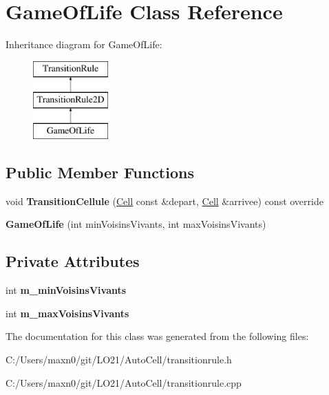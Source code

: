 \hypertarget{class_game_of_life}{}\section{Game\+Of\+Life Class Reference}
\label{class_game_of_life}
Inheritance diagram for Game\+Of\+Life\+:\begin{figure}[H]
\begin{center}
\leavevmode
\includegraphics[height=3.000000cm]{class_game_of_life}
\end{center}
\end{figure}
\subsection*{Public Member Functions}
\begin{DoxyCompactItemize}
\item 
\mbox{\label{class_game_of_life_a12e6db1719e64adc023e1a7d2976d38d}} 
void {\bfseries Transition\+Cellule} (\mbox{\hyperlink{class_cell}{Cell}} const \&depart, \mbox{\hyperlink{class_cell}{Cell}} \&arrivee) const override
\item 
\mbox{\label{class_game_of_life_ab1610dad2febf49643946df433f57e16}} 
{\bfseries Game\+Of\+Life} (int min\+Voisins\+Vivants, int max\+Voisins\+Vivants)
\end{DoxyCompactItemize}
\subsection*{Private Attributes}
\begin{DoxyCompactItemize}
\item 
\mbox{\label{class_game_of_life_a6b226593193a9abc89f2e9bace29adab}} 
int {\bfseries m\+\_\+min\+Voisins\+Vivants}
\item 
\mbox{\label{class_game_of_life_a051fd883fade89d92adcaf7ec216936f}} 
int {\bfseries m\+\_\+max\+Voisins\+Vivants}
\end{DoxyCompactItemize}


The documentation for this class was generated from the following files\+:\begin{DoxyCompactItemize}
\item 
C\+:/\+Users/maxn0/git/\+L\+O21/\+Auto\+Cell/transitionrule.\+h\item 
C\+:/\+Users/maxn0/git/\+L\+O21/\+Auto\+Cell/transitionrule.\+cpp\end{DoxyCompactItemize}
